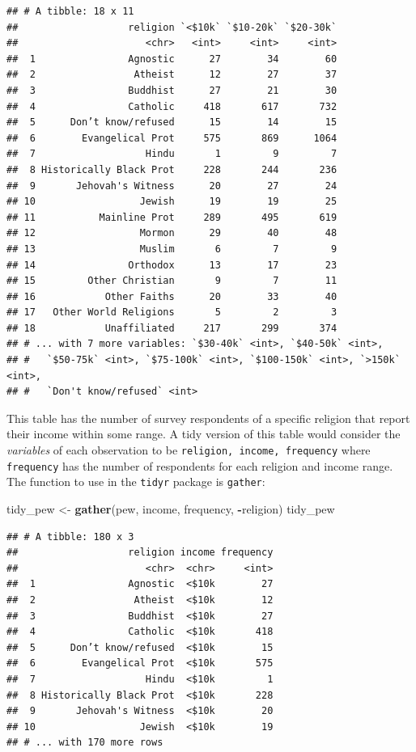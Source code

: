 \documentclass[]{book}
\newenvironment{Shaded}{\begin{snugshade}}{\end{snugshade}}
\newcommand{\KeywordTok}[1]{\textcolor[rgb]{0.13,0.29,0.53}{\textbf{#1}}}
\newcommand{\StringTok}[1]{\textcolor[rgb]{0.31,0.60,0.02}{#1}}
\newcommand{\OperatorTok}[1]{\textcolor[rgb]{0.81,0.36,0.00}{\textbf{#1}}}
\newcommand{\NormalTok}[1]{#1}
\theoremstyle{definition}
\theoremstyle{definition}
\theoremstyle{remark}
\begin{document}
\begin{verbatim}
## # A tibble: 18 x 11
##                   religion `<$10k` `$10-20k` `$20-30k`
##                      <chr>   <int>     <int>     <int>
##  1                Agnostic      27        34        60
##  2                 Atheist      12        27        37
##  3                Buddhist      27        21        30
##  4                Catholic     418       617       732
##  5      Don’t know/refused      15        14        15
##  6        Evangelical Prot     575       869      1064
##  7                   Hindu       1         9         7
##  8 Historically Black Prot     228       244       236
##  9       Jehovah's Witness      20        27        24
## 10                  Jewish      19        19        25
## 11           Mainline Prot     289       495       619
## 12                  Mormon      29        40        48
## 13                  Muslim       6         7         9
## 14                Orthodox      13        17        23
## 15         Other Christian       9         7        11
## 16            Other Faiths      20        33        40
## 17   Other World Religions       5         2         3
## 18            Unaffiliated     217       299       374
## # ... with 7 more variables: `$30-40k` <int>, `$40-50k` <int>,
## #   `$50-75k` <int>, `$75-100k` <int>, `$100-150k` <int>, `>150k` <int>,
## #   `Don't know/refused` <int>
\end{verbatim}

This table has the number of survey respondents of a specific religion
that report their income within some range. A tidy version of this table
would consider the \emph{variables} of each observation to be
\texttt{religion,\ income,\ frequency} where \texttt{frequency} has the
number of respondents for each religion and income range. The function
to use in the \texttt{tidyr} package is \texttt{gather}:

\begin{Shaded}
\begin{Highlighting}[]
\NormalTok{tidy_pew <-}\StringTok{ }\KeywordTok{gather}\NormalTok{(pew, income, frequency, }\OperatorTok{-}\NormalTok{religion)}
\NormalTok{tidy_pew}
\end{Highlighting}
\end{Shaded}

\begin{verbatim}
## # A tibble: 180 x 3
##                   religion income frequency
##                      <chr>  <chr>     <int>
##  1                Agnostic  <$10k        27
##  2                 Atheist  <$10k        12
##  3                Buddhist  <$10k        27
##  4                Catholic  <$10k       418
##  5      Don’t know/refused  <$10k        15
##  6        Evangelical Prot  <$10k       575
##  7                   Hindu  <$10k         1
##  8 Historically Black Prot  <$10k       228
##  9       Jehovah's Witness  <$10k        20
## 10                  Jewish  <$10k        19
## # ... with 170 more rows
\end{verbatim}
\end{document}
